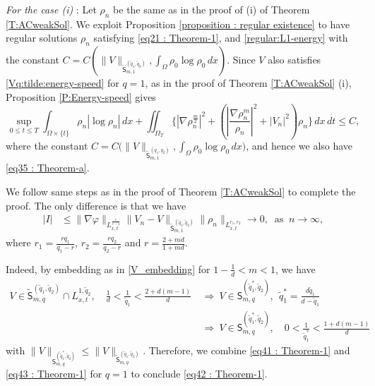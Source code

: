 \documentclass{amsart}
\numberwithin{equation}{section}
\begin{document}
{\it For the case (i)} : Let  $\rho_n$ be the same as in the proof of (i) of Theorem \ref{T:ACweakSol}.
 We exploit Proposition \ref{proposition : regular existence} to have regular solutions $\rho_n$ %
satisfying  \eqref{eq21 : Theorem-1}, and \eqref{regular:L1-energy} with the constant $C=C(  \|V\|_{\tilde{\mathsf{S}}_{m, 1}^{(\tilde{q}_1,\tilde{q}_2)}}, \int_{\Omega}\rho_0 \log \rho_0 \,dx )$.
Since $V$ also satisfies \eqref{Vq:tilde:energy-speed} for $q=1$, as in the proof of Theorem \ref{T:ACweakSol} (i), Proposition \ref{P:Energy-speed} gives 
\begin{equation*}\label{eq11 : Theorem-2-c}
\sup_{0\leq t \leq T}\int_{\Omega \times \{ t\}}\rho_n |\log \rho_n|  \,dx
+ \iint_{\Omega_T} \{ \left|\nabla \rho_{n}^{\frac{m}{2}} \right|^2 + \left (\left | \frac{\nabla \rho_n^m}{\rho_n}\right |^{2} +|V_n|^{2} \right )\rho_n \}\,dx\,dt \leq C,
\end{equation*}
where the constant $C=C \big(\|V\|_{\tilde{\mathsf{S}}_{m, 1}^{(q_1,q_2)}}, \int_{\Omega} \rho_0 \log \rho_0 \,dx\big)$, and hence we also have \eqref{eq35 : Theorem-a}.

We follow  same steps as in the proof of Theorem \ref{T:ACweakSol}  to complete the proof. The only difference is that we have
 \begin{equation}\label{eq42 : Theorem-1}
\begin{aligned}
| I | &\leq  \| \nabla \varphi \|_{L_{x,t}^{\frac{r}{r-1}}} \|V_n-V\|_{\tilde{\mathsf{S}}_{m,1}^{(\tilde{q}_1,\tilde{q}_2)}} \|\rho_n\|_{L^{r_1, r_2}_{x,t}} \longrightarrow 0, \ \mbox{ as } \ n\rightarrow \infty,
\end{aligned}
\end{equation}
where   $r_1=\frac{ r q_1}{q_1-r} $,  $r_2=\frac{ r q_2}{q_2-r} $ and $ r= \frac{2+md}{1+md} $.  

Indeed, by embedding as in \eqref{V_embedding} for $1-\frac{1}{d}< m < 1$, we have
\begin{equation}\label{eq43 : Theorem-1}
\begin{aligned}
V \in \tilde{\mathsf{S}}_{m,q}^{(\tilde{q}_1,\tilde{q}_2)} \cap L_{x,t}^{1, \tilde{q}_2}, \quad \frac{1}{d}<\frac{1}{\tilde{q}_1} <\frac{2+d(m-1)}{d}  ~ &\Longrightarrow ~
V \in \mathsf{S}_{m,q}^{(\tilde{q}_1^*, \tilde{q}_2)}, ~~ \tilde{q}_1^*=\frac{d\tilde{q}_1}{d-\tilde{q}_1} \\
~ &\Longrightarrow ~ V \in \mathsf{S}_{m,q}^{(\tilde{q}_1^*, \tilde{q}_2)},  \quad 0<\frac{1}{\tilde{q}_1^*} <\frac{1+d(m-1)}{d} 
\end{aligned}
\end{equation}
 with $\|V \|_{\mathsf{S}_{m,q}^{(\tilde{q}_1^*, \tilde{q}_2)}} \leq \|V \|_{\tilde{\mathsf{S}}_{m,q}^{(\tilde{q}_1, \tilde{q}_2)}}$.  
 Therefore, we combine \eqref{eq41 : Theorem-1} and \eqref{eq43 : Theorem-1} for $q=1$ to conclude \eqref{eq42 : Theorem-1}.
\end{document}
